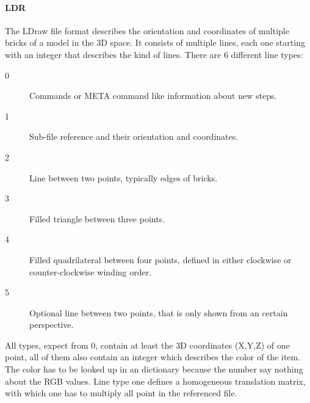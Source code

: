\documentclass[11pt,a4paper]{article}
\begin{document}
	\paragraph{LDR} 
	The LDraw file format describes the orientation and coordinates of multiple bricks of a model in the 3D space. It consists of multiple lines, each one starting with an integer that describes the kind of lines. There are 6 different line types: 
	\begin{description}
		\item[0] Commands or META command like information about new steps.
		\item[1] Sub-file reference and their orientation and coordinates.
		\item[2] Line between two points, typically edges of bricks.
		\item[3] Filled triangle between three points.
		\item[4] Filled quadrilateral between four points, defined in either clockwise or counter-clockwise winding order.
		\item[5] Optional line between two points, that is only shown from an certain perspective.
	\end{description}
	All types, expect from 0, contain at least the 3D coordinates (X,Y,Z) of one point, all of them also contain an integer which describes the color of the item. The color has to be looked up in an dictionary because the number say nothing about the RGB values. Line type one defines a homogeneous translation matrix, with which one has to multiply all point in the referenced file.
	
\end{document}
